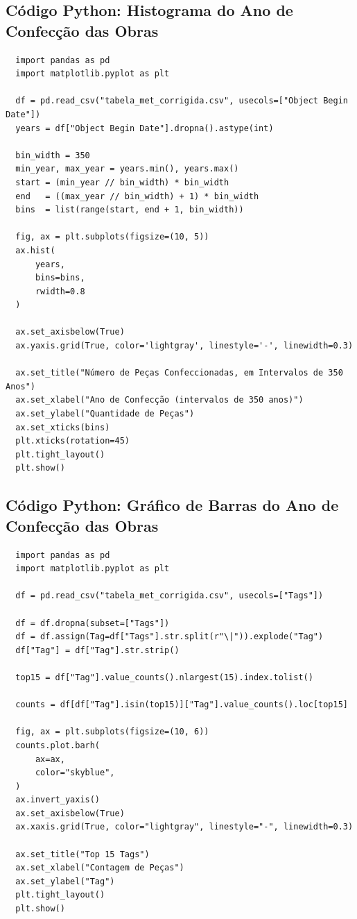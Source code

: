 \documentclass[11pt,a4paper]{article}
\begin{document}
\subsection*{Código Python: Histograma do Ano de Confecção das Obras}
\label{anx:codigo_histograma_object_begin_date}
\begin{verbatim}
  import pandas as pd
  import matplotlib.pyplot as plt
  
  df = pd.read_csv("tabela_met_corrigida.csv", usecols=["Object Begin Date"])
  years = df["Object Begin Date"].dropna().astype(int)
  
  bin_width = 350
  min_year, max_year = years.min(), years.max()
  start = (min_year // bin_width) * bin_width
  end   = ((max_year // bin_width) + 1) * bin_width
  bins  = list(range(start, end + 1, bin_width))
  
  fig, ax = plt.subplots(figsize=(10, 5))
  ax.hist(
      years,
      bins=bins,
      rwidth=0.8
  )
  
  ax.set_axisbelow(True) 
  ax.yaxis.grid(True, color='lightgray', linestyle='-', linewidth=0.3)
  
  ax.set_title("Número de Peças Confeccionadas, em Intervalos de 350 Anos")
  ax.set_xlabel("Ano de Confecção (intervalos de 350 anos)")
  ax.set_ylabel("Quantidade de Peças")
  ax.set_xticks(bins)
  plt.xticks(rotation=45)
  plt.tight_layout()
  plt.show()
\end{verbatim}

\subsection*{Código Python: Gráfico de Barras do Ano de Confecção das Obras}
\label{anx:codigo_barplot_object_begin_date}
\begin{verbatim}
  import pandas as pd
  import matplotlib.pyplot as plt
  
  df = pd.read_csv("tabela_met_corrigida.csv", usecols=["Tags"])
  
  df = df.dropna(subset=["Tags"])
  df = df.assign(Tag=df["Tags"].str.split(r"\|")).explode("Tag")
  df["Tag"] = df["Tag"].str.strip() 
  
  top15 = df["Tag"].value_counts().nlargest(15).index.tolist()
  
  counts = df[df["Tag"].isin(top15)]["Tag"].value_counts().loc[top15]
  
  fig, ax = plt.subplots(figsize=(10, 6))
  counts.plot.barh(
      ax=ax,
      color="skyblue",
  )
  ax.invert_yaxis()        
  ax.set_axisbelow(True)
  ax.xaxis.grid(True, color="lightgray", linestyle="-", linewidth=0.3)
  
  ax.set_title("Top 15 Tags")
  ax.set_xlabel("Contagem de Peças")
  ax.set_ylabel("Tag")
  plt.tight_layout()
  plt.show()
\end{verbatim}
\end{document}
